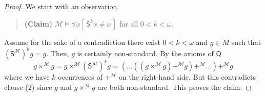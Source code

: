\documentclass[10pt,a4paper, openany,  oldfontcommands]{memoir}
\newtheorem{open problem} [theorem] {Open Problem}
\newtheorem{open question} [theorem] {Open Question}
\renewcommand{\mathrm}{\mathsf}
\begin{document}
\begin{proof}


We start with an observation.


  \begin{quote} {\bf (Claim)} \;\;\;\;\;\;    
$  \mathcal{M}  \models  \forall x  \left[   \,  \mathrm{S}^k  x  \neq   x    \,   \right]    $  for all $  0 <  k <  \omega   $.
 \end{quote}  


Assume for the sake of a contradiction  there exist  $  0 < k  <  \omega $  and  $ g  \in  M  $  such that 
   $     \left( \mathrm{S}^{  \mathcal{M} }  \right)^{k}   g  =  g  $. 
Then, $ g$ is  certainly non-standard. 
By the axioms of  $  \mathsf{Q} $
\[
g  \times^{   \mathcal{M}   }  g  =   g    \times^{   \mathcal{M}   }      \left( \mathrm{S}^{  \mathcal{M} }  \right)^{k}   g    =  
\left(   \ldots 
\left( 
\left(  g  \times^{   \mathcal{M}   }        g   \right)  +^{   \mathcal{M}  }   g    \right)    +^{   \mathcal{M}  }   \ldots 
  \right)    +^{   \mathcal{M}  }    g 
\]
where we have   $  k$  occurrences of  $   +^{   \mathcal{M}  }  $  on the right-hand side. 
But this contradicts clause (2) since  $g$  and  $  g  \times^{   \mathcal{M}   }  g  $  are both  non-standard. 
This proves the claim. 





\end{proof}
\end{document}
